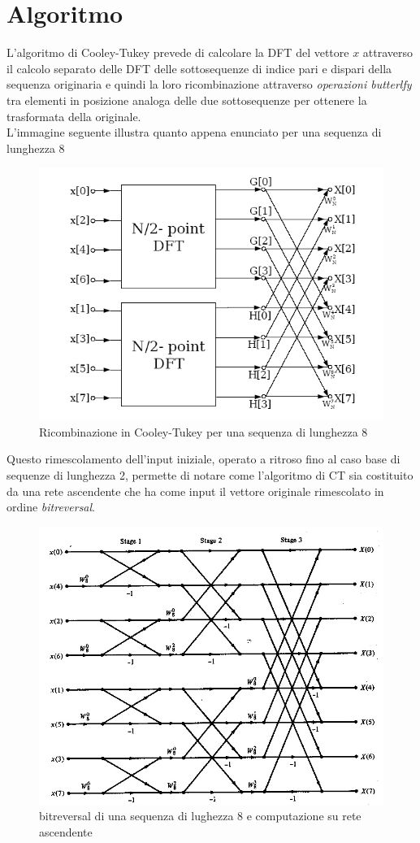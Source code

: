 \documentclass[12pt,a4paper,oneside,openright]{article}
\begin{document}
\section{Algoritmo}
L'algoritmo di Cooley-Tukey prevede di calcolare la DFT del vettore $x$ attraverso il calcolo separato delle DFT delle sottosequenze di indice pari e dispari della sequenza originaria e quindi la loro ricombinazione attraverso \emph{operazioni butterlfy} tra elementi in posizione analoga delle due sottosequenze per ottenere la trasformata della originale.\\
L'immagine seguente illustra quanto appena enunciato per una sequenza di lunghezza 8
\begin{figure}[H] 
  \centering
      \includegraphics[width=\textwidth]{immagini/cooley-tukey}
  \caption{Ricombinazione in Cooley-Tukey per una sequenza di lunghezza 8}
\end{figure}
Questo rimescolamento dell'input iniziale, operato a ritroso fino al caso base di sequenze di lunghezza 2, permette di notare come l'algoritmo di CT sia costituito da una rete ascendente che ha come input il vettore originale rimescolato in ordine \emph{bitreversal}.
\begin{figure}[H] 
  \centering
      \includegraphics[width=\textwidth]{immagini/alg-asc}
  \caption{bitreversal di una sequenza di lughezza 8 e computazione su rete ascendente}
\end{figure}
\end{document}

